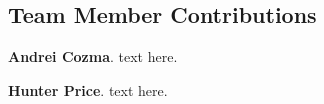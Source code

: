 \appendix
\subsection{Team Member Contributions}

\textbf{Andrei Cozma}. text here.


\textbf{Hunter Price}. text here.




